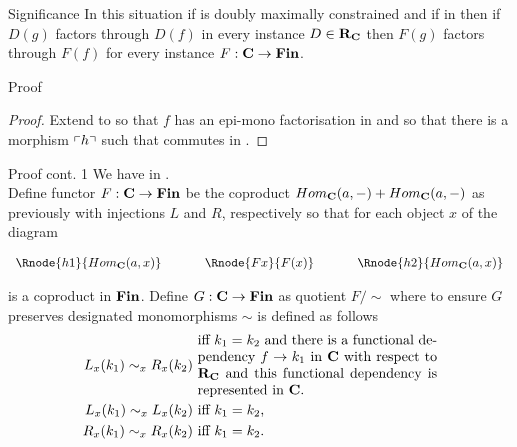 \begin{frame}{Significance}
In this situation if \catcw is doubly maximally constrained 
and if \scalebox{0.9}{\fgsourcediagram} in \catcw
then if $D(g)$ factors through
$D(f)$ in every instance $D \in \textbf{R}_{\textbf{C}}$  then   
$F(g)$ factors through
$F(f)$ for every instance $F: \textbf{C} \rightarrow \textbf{Fin}$. 
\end{frame}

\iffalse
\begin{frame} {Proof}
\begin{proof} Extend \catcw to \catcpw so that $f$ has an epi-mono factorisation in \catcpw
and so that there  is a morphism $\left\ulcorner h\right\urcorner$ such that
commutes in \catcp.  
\end{proof}
\end{frame}

\begin{frame}{Proof cont. 1}
We have \fgsourcediagram in \catc. \\
\medskip
Define functor $F: \textbf{C} \rightarrow \textbf{Fin}$ be the coproduct $Hom_{\textbf{C}}(a,-) + Hom_{\textbf{C}}(a,-)$
as previously with injections $L$ and $R$, respectively so that
for each object $x$ of \catcw the diagram
\begin{center}
$
\begin{array}{c p{0.5cm} c p{0.5cm} c  }
\Rnode{h1}{Hom_{\catc}(a,x)}  &&\Rnode{Fx}{F(x)}  &&   \Rnode{h2}{Hom_{\catc}(a,x)}       
\end{array} 
$
\end{center}
is a coproduct in $\textbf{Fin}$.
\medskip
Define $G: \textbf{C} \rightarrow \textbf{Fin}$ as quotient $F/\sim$ where 
to ensure $G$ preserves designated monomorphisms  $\sim$ is defined as follows
\begin{align*}
L_x(k_1) \sim_x R_x(k_2) & \mbox{ \parbox{6cm}{iff  $k_1=k_2$ and there is a functional dependency 
$f \morph k_1$ in \catcw with respect to $\reqtc$ and  this functional dependency is represented in \catc.}}\\
L_x(k_1) \sim_x L_x(k_2) & \mbox{ iff $k_1 = k_2$,} \\
R_x(k_1) \sim_x R_x(k_2) & \mbox{ iff $k_1 = k_2$.} \\
\end{align*} 
\end{frame}

